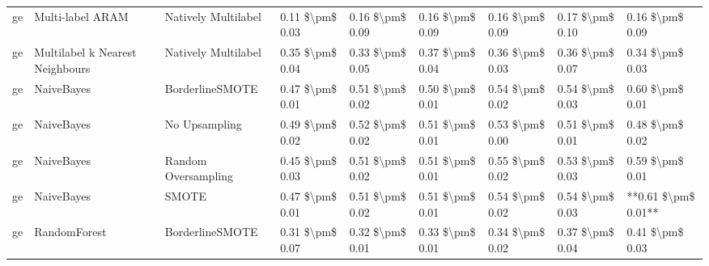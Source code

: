\begin{tabular}{lllllllll}
      ge &                Multi-label ARAM &           Natively Multilabel & 0.11 \$\textbackslash pm\$ 0.03 &           0.16 \$\textbackslash pm\$ 0.09 &       0.16 \$\textbackslash pm\$ 0.09 &        0.16 \$\textbackslash pm\$ 0.09 &                         0.17 \$\textbackslash pm\$ 0.10 &     0.16 \$\textbackslash pm\$ 0.09 \\
      ge & Multilabel k Nearest Neighbours &           Natively Multilabel & 0.35 \$\textbackslash pm\$ 0.04 &           0.33 \$\textbackslash pm\$ 0.05 &       0.37 \$\textbackslash pm\$ 0.04 &        0.36 \$\textbackslash pm\$ 0.03 &                         0.36 \$\textbackslash pm\$ 0.07 &     0.34 \$\textbackslash pm\$ 0.03 \\
      ge &                      NaiveBayes &               BorderlineSMOTE & 0.47 \$\textbackslash pm\$ 0.01 &           0.51 \$\textbackslash pm\$ 0.02 &       0.50 \$\textbackslash pm\$ 0.01 &        0.54 \$\textbackslash pm\$ 0.02 &                         0.54 \$\textbackslash pm\$ 0.03 &     0.60 \$\textbackslash pm\$ 0.01 \\
      ge &                      NaiveBayes &                 No Upsampling & 0.49 \$\textbackslash pm\$ 0.02 &           0.52 \$\textbackslash pm\$ 0.02 &       0.51 \$\textbackslash pm\$ 0.01 &        0.53 \$\textbackslash pm\$ 0.00 &                         0.51 \$\textbackslash pm\$ 0.01 &     0.48 \$\textbackslash pm\$ 0.02 \\
      ge &                      NaiveBayes &           Random Oversampling & 0.45 \$\textbackslash pm\$ 0.03 &           0.51 \$\textbackslash pm\$ 0.02 &       0.51 \$\textbackslash pm\$ 0.01 &        0.55 \$\textbackslash pm\$ 0.02 &                         0.53 \$\textbackslash pm\$ 0.03 &     0.59 \$\textbackslash pm\$ 0.01 \\
      ge &                      NaiveBayes &                         SMOTE & 0.47 \$\textbackslash pm\$ 0.01 &           0.51 \$\textbackslash pm\$ 0.02 &       0.51 \$\textbackslash pm\$ 0.01 &        0.54 \$\textbackslash pm\$ 0.02 &                         0.54 \$\textbackslash pm\$ 0.03 & **0.61 \$\textbackslash pm\$ 0.01** \\
      ge &                    RandomForest &               BorderlineSMOTE & 0.31 \$\textbackslash pm\$ 0.07 &           0.32 \$\textbackslash pm\$ 0.01 &       0.33 \$\textbackslash pm\$ 0.01 &        0.34 \$\textbackslash pm\$ 0.02 &                         0.37 \$\textbackslash pm\$ 0.04 &     0.41 \$\textbackslash pm\$ 0.03 \\

\end{tabular}
